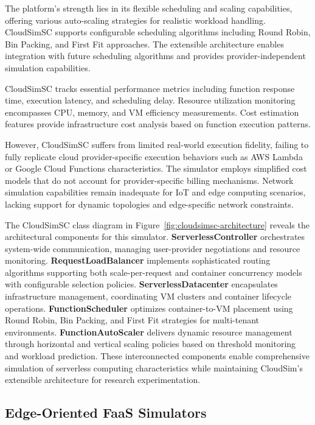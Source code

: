 The platform's strength lies in its flexible scheduling and scaling capabilities, offering various auto-scaling strategies for realistic workload handling. CloudSimSC supports configurable scheduling algorithms including Round Robin, Bin Packing, and First Fit approaches. The extensible architecture enables integration with future scheduling algorithms and provides provider-independent simulation capabilities.

CloudSimSC tracks essential performance metrics including function response time, execution latency, and scheduling delay. Resource utilization monitoring encompasses CPU, memory, and VM efficiency measurements. Cost estimation features provide infrastructure cost analysis based on function execution patterns.

However, CloudSimSC suffers from limited real-world execution fidelity, failing to fully replicate cloud provider-specific execution behaviors such as AWS Lambda or Google Cloud Functions characteristics. The simulator employs simplified cost models that do not account for provider-specific billing mechanisms. Network simulation capabilities remain inadequate for IoT and edge computing scenarios, lacking support for dynamic topologies and edge-specific network constraints.

The CloudSimSC class diagram in Figure~\ref{fig:cloudsimsc-architecture} reveals the architectural components for this simulator. \textbf{ServerlessController} orchestrates system-wide communication, managing user-provider negotiations and resource monitoring. \textbf{RequestLoadBalancer} implements sophisticated routing algorithms supporting both scale-per-request and container concurrency models with configurable selection policies. \textbf{ServerlessDatacenter} encapsulates infrastructure management, coordinating VM clusters and container lifecycle operations. \textbf{FunctionScheduler} optimizes container-to-VM placement using Round Robin, Bin Packing, and First Fit strategies for multi-tenant environments. \textbf{FunctionAutoScaler} delivers dynamic resource management through horizontal and vertical scaling policies based on threshold monitoring and workload prediction. These interconnected components enable comprehensive simulation of serverless computing characteristics while maintaining CloudSim's extensible architecture for research experimentation.




\subsection{Edge-Oriented FaaS Simulators}

